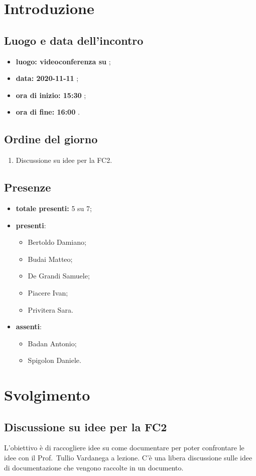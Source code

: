 \section*{Introduzione}
\subsection*{Luogo e data dell'incontro}
\begin{itemize}
	\item \textbf{luogo: videoconferenza su };
	\item \textbf{data: 2020-11-11} ;
	\item \textbf{ora di inizio: 15:30} ;
	\item \textbf{ora di fine: 16:00} .
\end{itemize}

\subsection*{Ordine del giorno}
\begin{enumerate}
	\item Discussione su idee per la FC2. 
\end{enumerate}

\subsection*{Presenze}
\begin{itemize}
	\item \textbf{totale presenti:} 5 su 7;
	\item \textbf{presenti}:
	\begin{itemize}
		\item Bertoldo Damiano;
		\item Budai Matteo;
		\item De Grandi Samuele;
		\item Piacere Ivan;
		\item Privitera Sara.
	\end{itemize}
 	\item \textbf{assenti}:
 	\begin{itemize}
 		\item Badan Antonio;
 		\item Spigolon Daniele.
 	\end{itemize}
\end{itemize}

\section*{Svolgimento}
\subsection*{Discussione su idee per la FC2}
L'obiettivo è di raccogliere idee su come documentare per poter confrontare le idee con il Prof.~Tullio Vardanega a lezione. C'è una libera discussione sulle idee di documentazione che vengono raccolte in un documento.
